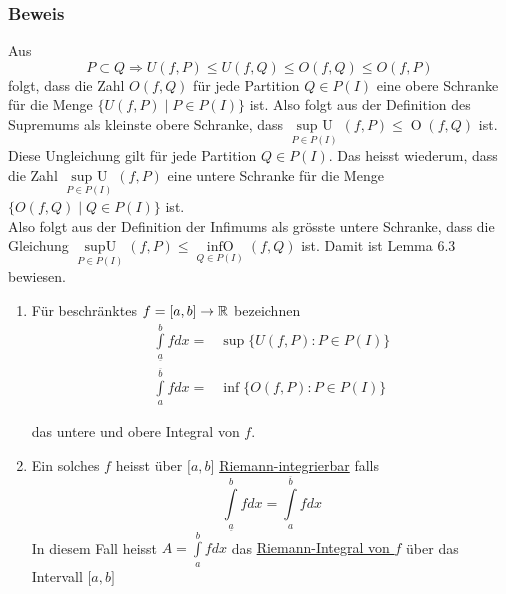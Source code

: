 \subsubsection*{Beweis}
Aus \[P\subset Q \Rightarrow U(f,P) \leq U(f,Q) \leq O(f,Q) \leq O(f,P)\] folgt, dass die Zahl $O(f,Q)$ für jede Partition $Q\in P(I)$ eine obere Schranke für die Menge $\{ U(f,P)\mid P\in P(I)\}$ ist. Also folgt aus der Definition des Supremums als kleinste obere Schranke, dass $\mathop {\sup {\text{ }}U}\limits_{P \in P(I)} (f,P) \le \mathop O(f,Q)$ ist. \\
\newpage
Diese Ungleichung gilt für jede Partition $Q\in P(I)$. Das heisst wiederum, dass die Zahl $\mathop {\sup {\text{ }}U}\limits_{P \in P(I)} (f,P)$ eine untere Schranke für die Menge $\{ O(f,Q)\mid Q \in P(I)\} $ ist.\\

Also folgt aus der Definition der Infimums als grösste untere Schranke, dass die Gleichung $\mathop {\sup U}\limits_{P \in P(I)} (f,P) \le \mathop {\inf O}\limits_{Q \in P(I)} (f,Q)$ ist. Damit ist Lemma 6.3 bewiesen.
\begin{definition}{6.4}
\begin{enumerate}[\indent 1)]

\item Für beschränktes $f=\lbrack a,b \rbrack\rightarrow \mathbb{R}$ bezeichnen
\begin{align*}
\int\limits_{\underline{a}}^b fdx =&\sup \{ U(f,P):P \in P(I)\}\\
\int\limits_{a}^{\overline{b}} fdx =&\inf \{ O(f,P):P \in P(I)\}
\end{align*}

das untere und obere Integral von $f$.
\item Ein solches $f$ heisst über $\lbrack a,b\rbrack$ \underline{Riemann-integrierbar} falls \[\int\limits_{\underline{a}}^b {fdx}  = \int\limits_a^{\overline{b}} {fdx} \] In diesem Fall heisst $A = \int\limits_a^b {fdx} $ das \underline{Riemann-Integral von $f$} über das Intervall $\lbrack a,b\rbrack$
\end{enumerate}
\end{definition}

